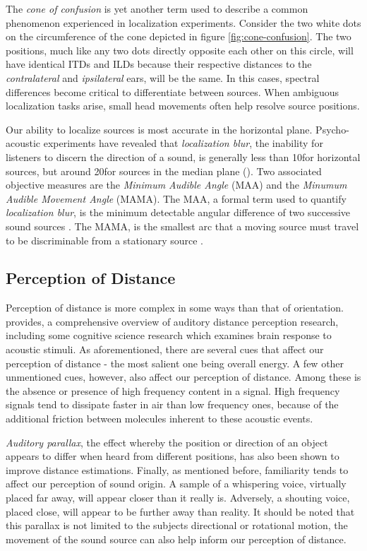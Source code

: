 The \textit{cone of confusion} is yet another term used to describe a common phenomenon experienced in localization experiments. Consider the two white dots on the circumference of the cone depicted in figure \ref{fig:cone-confusion}. The two positions, much like any two dots directly opposite each other on this circle, will have identical ITDs and ILDs because their respective distances to the \textit{contralateral} and \textit{ipsilateral} ears, will be the same. In this cases, spectral differences become critical to differentiate between sources. When ambiguous localization tasks arise, small head movements often help resolve source positions.

Our ability to localize sources is most accurate in the horizontal plane. Psycho-acoustic experiments have revealed that \textit{localization blur}, the inability for listeners to discern the direction of a sound, is generally less than 10\textdegree for horizontal sources, but around 20\textdegree for sources in the median plane (\cite{hacihabiboglu2017perceptual}). Two associated objective measures are the \textit{Minimum Audible Angle} (MAA) and the \textit{Minumum Audible Movement Angle} (MAMA). The MAA, a formal term used to quantify \textit{localization blur}, is the minimum detectable angular difference of two successive sound sources \cite{reardon2017evaluation}. The MAMA, is the smallest arc that a moving source must travel to be discriminable from a stationary source \cite{moore1995hearing}.

\subsection{Perception of Distance}

Perception of distance is more complex in some ways than that of orientation. \cite{zahorik2005auditory} provides, a comprehensive overview of auditory distance perception research, including some cognitive science research which examines brain response to acoustic stimuli. As aforementioned, there are several cues that affect our perception of distance - the most salient one being overall energy. A few other unmentioned cues, however, also affect our perception of distance. Among these is the absence or presence of high frequency content in a signal. High frequency signals tend to dissipate faster in air than low frequency ones, because of the additional friction between molecules inherent to these acoustic events. 

\textit{Auditory parallax}, the effect whereby the position or direction of an object appears to differ when heard from different positions, has also been shown to improve distance estimations. Finally, as mentioned before, familiarity tends to affect our perception of sound origin. A sample of a whispering voice, virtually placed far away, will appear closer than it really is. Adversely, a shouting voice, placed close, will appear to be further away than reality. It should be noted that this parallax is not limited to the subjects directional or rotational motion, the movement of the sound source can also help inform our perception of distance.

